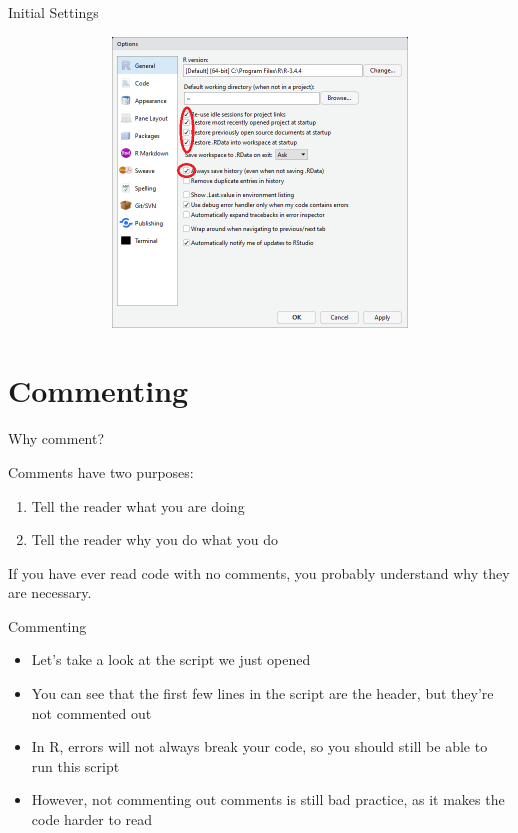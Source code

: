 \documentclass[ignorenonframetext,]{beamer}
\begin{document}
\begin{frame}{Initial Settings}

\begin{figure}
\centering
  \includegraphics[width=12cm,height=7.7cm]{img/Options3.png}
\end{figure}

\end{frame}

\section{Commenting}\label{commenting}

\begin{frame}{Why comment?}

Comments have two purposes:

\begin{enumerate}
    \item Tell the reader what you are doing
    \item Tell the reader why you do what you do
  \end{enumerate}

If you have ever read code with no comments, you probably understand why
they are necessary.

\end{frame}

\begin{frame}{Commenting}

\begin{itemize}
    \item Let's take a look at the script we just opened
    \item You can see that the first few lines in the script are the header, but they're not commented out
    \item In R, errors will not always break your code, so you should still be able to run this script
    \item However, not commenting out comments is still bad practice, as it makes the code harder to read
  \end{itemize}

\end{frame}
\end{document}
